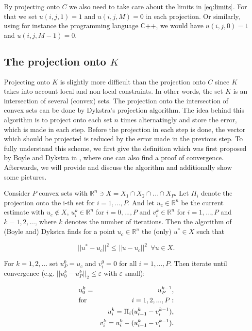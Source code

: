     \begin{remark}
        By projecting onto $C$ we also need to take care about the limits in \ref{eq:limits}. For that we set $u(i, j, 1) = 1$ and $u(i, j, M) = 0$ in each projection. Or similarly, using for instance the programming language C++, we would have $u(i, j, 0) = 1$ and $u(i, j, M-1) = 0$.
    \end{remark}

    \subsection{The projection onto $K$} %
    \label{sub:the_projection_onto_K}

        Projecting onto $K$ is slightly more difficult than the projection onto $C$ since $K$ takes into account local and non-local constraints. In other words, the set $K$ is an intersection of several (convex) sets. The projection onto the intersection of convex sets can be done by Dykstra's projection algorithm. The idea behind this algorithm is to project onto each set $n$ times alternatingly and store the error, which is made in each step. Before the projection in each step is done, the vector which should be projected is reduced by the error made in the previous step. To fully understand this scheme, we first give the definition which was first proposed by Boyle and Dykstra in \cite{dykstra-et-al-aors14}, where one can also find a proof of convergence. Afterwards, we will provide and discuss the algorithm and additionally show some pictures.

        Consider $P$ convex sets with $\mathbb{R}^{n} \ni X = X_{1} \cap X_{2} \cap ... \cap X_{P}$. Let $\Pi_{i}$ denote the projection onto the i-th set for $i = 1, ..., P$. And let $u_{c} \in \mathbb{R}^{n}$ be the current estimate with $u_{c} \notin X$, $u_{i}^{k} \in \mathbb{R}^{n}$ for $i = 0, ..., P$ and $v_{i}^{k} \in \mathbb{R}^{n}$ for $i = 1, ..., P$ and $k = 1, 2, ...$, where $k$ denotes the number of iterations. Then the algorithm of (Boyle and) Dykstra finds for a point $u_{c} \in \mathbb{R}^{n}$ the (only) $u^{\ast} \in X$ such that

        $$
            ||u^{\ast} - u_{c}||^{2} \le ||u - u_{c}||^{2} \,\,\, \forall u \in X.
        $$

        \begin{algorithm}\label{alg:dykstra}
            For $k = 1, 2, ...$ set $u^{0}_{P} = u_{c}$ and $v^{0}_{i} = 0$ for all $i = 1, ..., P$. Then iterate until convergence (e.g. $||u_{0}^{k} - u_{P}^{k}||_{2} \le \varepsilon$ with $\varepsilon$ small):

            \begin{eqnarray}
                &u_{0}^{k} = &u_{P}^{k-1}, \notag \\
                &\textnormal{for} \,\, &i = 1, 2, ..., P: \notag \\
                &&u_{i}^{k} = \Pi_{i}(u_{i-1}^{k} - v_{i}^{k-1}), \notag \\
                &&v_{i}^{k} = u_{i}^{k} - (u_{i-1}^{k} - v_{i}^{k-1}). \notag
            \end{eqnarray}
        \end{algorithm}

